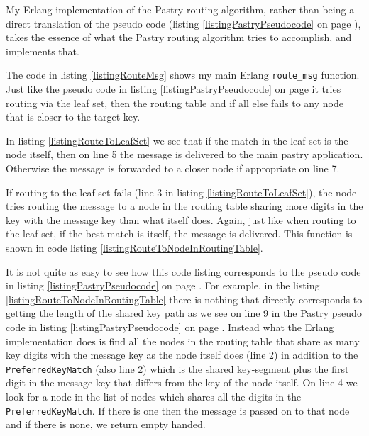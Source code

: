 \mbox{}

My Erlang implementation of the Pastry routing algorithm, rather than being a direct translation of the pseudo code (listing \ref{listingPastryPseudocode} on page \pageref{listingPastryPseudocode}), takes the essence of what the Pastry routing algorithm tries to accomplish, and implements that.

The code in listing \ref{listingRouteMsg} shows my main Erlang \verb=route_msg= function. 
Just like the pseudo code in listing \ref{listingPastryPseudocode} on page \pageref{listingPastryPseudocode} it tries routing via the leaf set, then the routing table and if all else fails to any node that is closer to the target key.



In listing \ref{listingRouteToLeafSet} we see that if the match in the leaf set is the node itself, then on line 5 the message is delivered to the main pastry application. Otherwise the message is forwarded to a closer node if appropriate on line 7.



If routing to the leaf set fails (line 3 in listing \ref{listingRouteToLeafSet}), the node tries routing the message to a node in the routing table sharing more digits in the key with the message key than what itself does. Again, just like when routing to the leaf set, if the best match is itself, the message is delivered. This function is shown in code listing \ref{listingRouteToNodeInRoutingTable}.

It is not quite as easy to see how this code listing corresponds to the pseudo code in listing \ref{listingPastryPseudocode} on page \pageref{listingPastryPseudocode}. For example, in the listing \ref{listingRouteToNodeInRoutingTable} there is nothing that directly corresponds to getting the length of the shared key path as we see on line 9 in the Pastry pseudo code in listing \ref{listingPastryPseudocode} on page \pageref{listingPastryPseudocode}. Instead what the Erlang implementation does is find all the nodes in the routing table that share as many key digits with the message key as the node itself does (line 2) in addition to the \verb=PreferredKeyMatch= (also line 2) which is the shared key-segment plus the first digit in the message key that differs from the key of the node itself.
On line 4 we look for a node in the list of nodes which shares all the digits in the \verb=PreferredKeyMatch=. If there is one then the message is passed on to that node and if there is none, we return empty handed.

